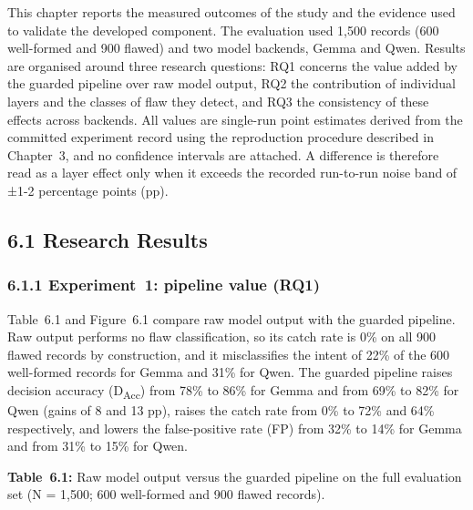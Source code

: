 \documentclass[
]{article}
\begin{document}
This chapter reports the measured outcomes of the study and the evidence
used to validate the developed component. The evaluation used 1,500
records (600 well-formed and 900 flawed) and two model backends, Gemma
and Qwen. Results are organised around three research questions: RQ1
concerns the value added by the guarded pipeline over raw model output,
RQ2 the contribution of individual layers and the classes of flaw they
detect, and RQ3 the consistency of these effects across backends. All
values are single-run point estimates derived from the committed
experiment record using the reproduction procedure described in
Chapter~3, and no confidence intervals are attached. A difference is
therefore read as a layer effect only when it exceeds the recorded
run-to-run noise band of ±1-2 percentage points (pp).

\hypertarget{research-results}{%
\subsection{6.1 Research Results}\label{research-results}}

\hypertarget{experiment-1-pipeline-value-rq1}{%
\subsubsection{6.1.1 Experiment~1: pipeline value
(RQ1)}\label{experiment-1-pipeline-value-rq1}}

Table~6.1 and Figure~6.1 compare raw model output with the guarded
pipeline. Raw output performs no flaw classification, so its catch rate
is 0\% on all 900 flawed records by construction, and it misclassifies
the intent of 22\% of the 600 well-formed records for Gemma and 31\% for
Qwen. The guarded pipeline raises decision accuracy
(D\textsubscript{Acc}) from 78\% to 86\% for Gemma and from 69\% to 82\%
for Qwen (gains of 8 and 13 pp), raises the catch rate from 0\% to 72\%
and 64\% respectively, and lowers the false-positive rate (FP) from 32\%
to 14\% for Gemma and from 31\% to 15\% for Qwen.

\protect\hypertarget{_Toc900118}{}{}\textbf{Table~6.1:} Raw model output
versus the guarded pipeline on the full evaluation set (N = 1,500; 600
well-formed and 900 flawed records).
\end{document}
